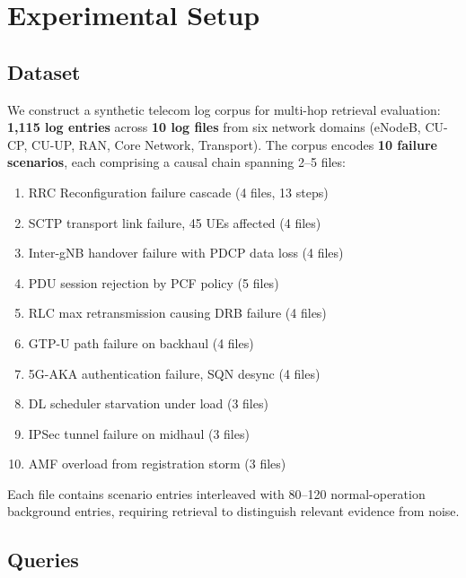 \documentclass[11pt,a4paper]{article}
\begin{document}

\section{Experimental Setup}
\label{sec:setup}

\subsection{Dataset}

We construct a synthetic telecom log corpus for multi-hop retrieval
evaluation: \textbf{1{,}115 log entries} across \textbf{10 log files}
from six network domains (eNodeB, CU-CP, CU-UP, RAN, Core Network,
Transport).
The corpus encodes \textbf{10 failure scenarios}, each comprising a
causal chain spanning 2--5 files:

\begin{enumerate}[nosep]
    \item RRC Reconfiguration failure cascade (4 files, 13 steps)
    \item SCTP transport link failure, 45 UEs affected (4 files)
    \item Inter-gNB handover failure with PDCP data loss (4 files)
    \item PDU session rejection by PCF policy (5 files)
    \item RLC max retransmission causing DRB failure (4 files)
    \item GTP-U path failure on backhaul (4 files)
    \item 5G-AKA authentication failure, SQN desync (4 files)
    \item DL scheduler starvation under load (3 files)
    \item IPSec tunnel failure on midhaul (3 files)
    \item AMF overload from registration storm (3 files)
\end{enumerate}

Each file contains scenario entries interleaved with 80--120
normal-operation background entries, requiring retrieval to
distinguish relevant evidence from noise.

\subsection{Queries}
\end{document}

